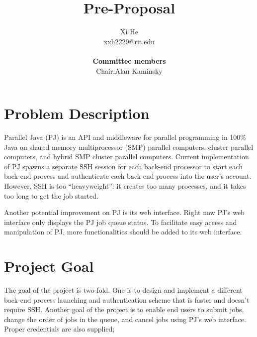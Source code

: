 \documentclass[10pt]{article}
\begin{document}
\title{Pre-Proposal}
\author{Xi He\\ xxh2229@rit.edu\\~\\{\bf Committee members}\\Chair:Alan Kaminsky}

\maketitle
\section{Problem Description}
Parallel Java (PJ) is an API and middleware for parallel programming in 100\% Java on shared memory multiprocessor (SMP) parallel computers, cluster parallel computers, and hybrid SMP cluster parallel computers.
Current implementation of PJ spawns a separate SSH session for each back-end processor to start each back-end process and authenticate each back-end process into the user's account. However, SSH is too ``heavyweight'': it creates too many processes, and it takes too long to get the job started. 

Another potential improvement on PJ is its web interface. Right now PJ's web interface only displays the PJ job queue status. To facilitate easy access and manipulation of PJ, more functionalities should be added to its web interface.

\section{Project Goal}
The goal of the project is two-fold. One is to design and implement a different back-end process launching and authentication scheme that is faster and doesn't require SSH. Another goal of the project is to enable end users to submit jobs, change the order of jobs in the queue, and cancel jobs using PJ's web interface. Proper credentials are also supplied; 
\end{document}

